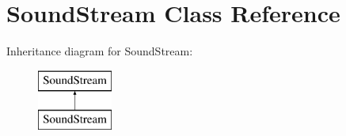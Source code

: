 \hypertarget{classSoundStream}{}\section{Sound\+Stream Class Reference}
\label{classSoundStream}
Inheritance diagram for Sound\+Stream\+:\begin{figure}[H]
\begin{center}
\leavevmode
\includegraphics[height=2.000000cm]{classSoundStream}
\end{center}
\end{figure}
